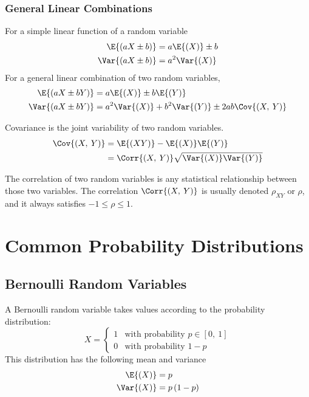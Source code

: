 \documentclass{article}
\begin{document}
\subsubsection{General Linear Combinations}
For a simple linear function of a random variable
\begin{align*}
    \E{\left( aX \pm b \right)}   & = a\E{\left( X \right)} \pm b \\
    \Var{\left( aX \pm b \right)} & = a^2\Var{\left( X \right)}
\end{align*}
For a general linear combination of two random variables,
\begin{align*}
    \E{\left( aX \pm bY \right)}   & = a\E{\left( X \right)} \pm b\E{\left( Y \right)}                                           \\
    \Var{\left( aX \pm bY \right)} & = a^2\Var{\left( X \right)} + b^2\Var{\left( Y \right)} \pm 2ab \Cov{\left( X,\: Y \right)}
\end{align*}
\begin{definition}[Covariance]
    Covariance is the joint variability of two random variables.
    \begin{align*}
        \Cov{\left( X,\: Y \right)} & = \E{\left( XY \right)} - \E{\left( X \right)} \E{\left( Y \right)}                 \\
                                    & = \Corr{\left( X,\: Y \right)} \sqrt{\Var{\left( X \right)} \Var{\left( Y \right)}}
    \end{align*}
\end{definition}
\begin{definition}[Correlation]
    The correlation of two random variables is any statistical \linebreak relationship between
    those two variables. The correlation \(\Corr{\left( X,\: Y \right)}\) is usually denoted \(\rho_{XY}\) or \(\rho \),
    and it always satisfies \(-1 \leq\rho\leq 1\).
\end{definition}
\section{Common Probability Distributions}
\subsection{Bernoulli Random Variables}
A Bernoulli random variable takes values according to the probability distribution:
\begin{equation*}
    X =
    \begin{cases}
        1 & \text{with probability \(p\in\left[ 0,\: 1 \right]\)} \\
        0 & \text{with probability \(1 - p\)}
    \end{cases}
\end{equation*}
This distribution has the following mean and variance
\begin{align*}
    \E{\left( X \right)}   & = p                     \\
    \Var{\left( X \right)} & = p\left( 1 - p \right)
\end{align*}
\end{document}
